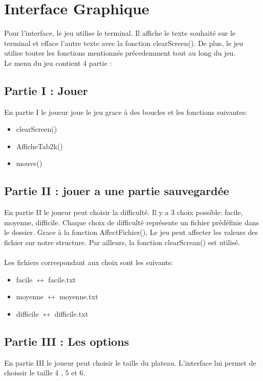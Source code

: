 \documentclass{article}
\begin{document}
\section{Interface Graphique}
Pour l'interface, le jeu utilise le terminal. Il affiche le texte souhaité sur le terminal et efface l'autre texte avec la fonction clearScreen(). De plus, le jeu utilise toutes les fonctions mentionnés précedemment tout au long du jeu.
\\
Le menu du jeu contient 4 partie :

\subsection{Partie I : Jouer}
En partie I le joueur joue le jeu grace à des boucles et les fonctions suivantes:  

\begin{itemize}
	\item clearScreen()
	\item AfficheTab2k()
	\item mouve()
\end{itemize}


\subsection{Partie II : jouer a une partie sauvegardée}
En partie II le joueur peut choisir la difficulté.
Il y a 3 choix possible: facile, moyenne, difficile.
Chaque choix de difficulté représente un fichier prédéfinie dans le dossier.
Grace à la fonction AffectFichier(), Le jeu peut affecter les valeurs des fichier sur notre structure.
Par ailleurs, la fonction clearScrean() est utilisé.
\\ \\
Les fichiers correspondant aux choix sont les suivants: 

\begin{itemize}
	\item facile $\leftrightarrow$ facile.txt
	\item moyenne $\leftrightarrow$ moyenne.txt
	\item difficile $\leftrightarrow$ difficile.txt
\end{itemize}


\subsection{Partie III : Les options}
En partie III le joueur peut choisir le taille du plateau. L'interface lui permet de choissir le taille 4 , 5 et 6.
\end{document}
